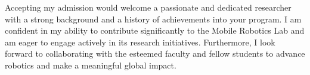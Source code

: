 \documentclass{article}
\begin{document}

Accepting my admission would welcome a passionate and dedicated researcher with a strong background 
and a history of achievements into your program. 
I am confident in my ability to contribute significantly to the Mobile Robotics Lab 
and am eager to engage actively in its research initiatives. 
Furthermore, I look forward to collaborating with the esteemed 
faculty and fellow students to advance robotics and make a meaningful global impact.

\printbibliography
\end{document}
